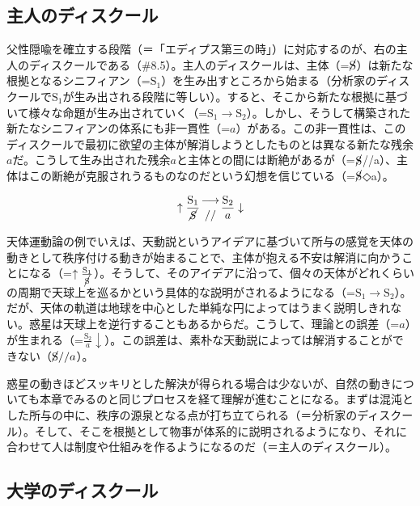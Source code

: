 \subsection{主人のディスクール}\label{ux4e3bux4ebaux306eux30c7ux30a3ux30b9ux30afux30fcux30eb}

父性隠喩を確立する段階（＝「エディプス第三の時」）に対応するのが、右の主人のディスクールである（\#8.5）。主人のディスクールは、主体（=\(\cancel{\textrm{S}}\)）は新たな根拠となるシニフィアン（=\(\textrm{S}_1\)）を生み出すところから始まる（分析家のディスクールで\(\textrm{S}_1\)が生み出される段階に等しい）。すると、そこから新たな根拠に基づいて様々な命題が生み出されていく（=\(\textrm{S}_1\rightarrow\textrm{S}_2\)）。しかし、そうして構築された新たなシニフィアンの体系にも非一貫性（=\(a\)）がある。この非一貫性は、このディスクールで最初に欲望の主体が解消しようとしたものとは異なる新たな残余\(a\)だ。こうして生み出された残余\(a\)と主体との間には断絶があるが（=\(\cancel{\textrm{S}}\)//a）、主体はこの断絶が克服されうるものなのだという幻想を信じている（=\(\cancel{\textrm{S}}\)◇a）。

\[
\uparrow\frac{\mathrm{S_1}}{\mathrm{\cancel{S}}}\genfrac{}{}{0pt}{}{\longrightarrow}{//}\frac{\mathrm{S_2}}{a}\downarrow
\]

天体運動論の例でいえば、天動説というアイデアに基づいて所与の感覚を天体の動きとして秩序付ける動きが始まることで、主体が抱える不安は解消に向かうことになる（=\(\uparrow\frac{\textrm{S}_1}{\cancel{\textrm{S}}}\)）。そうして、そのアイデアに沿って、個々の天体がどれくらいの周期で天球上を巡るかという具体的な説明がされるようになる（=\(\textrm{S}_1\rightarrow\textrm{S}_2\)）。だが、天体の軌道は地球を中心とした単純な円によってはうまく説明しきれない。惑星は天球上を逆行することもあるからだ。こうして、理論との誤差（=\(a\)）が生まれる（=\(\frac{\textrm{S}_2}{a}\downarrow\)）。この誤差は、素朴な天動説によっては解消することができない（\(\cancel{\textrm{S}}//a\)）。

惑星の動きほどスッキリとした解決が得られる場合は少ないが、自然の動きについても本章でみるのと同じプロセスを経て理解が進むことになる。まずは混沌とした所与の中に、秩序の源泉となる点が打ち立てられる（＝分析家のディスクール）。そして、そこを根拠として物事が体系的に説明されるようになり、それに合わせて人は制度や仕組みを作るようになるのだ（＝主人のディスクール）。

\subsection{大学のディスクール}\label{ux5927ux5b66ux306eux30c7ux30a3ux30b9ux30afux30fcux30eb}

